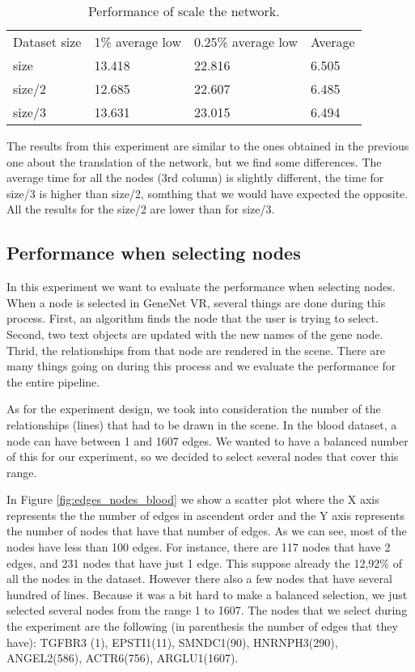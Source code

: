\begin{table}[h!]
\centering
\begin{tabular}{llll}
Dataset size & 1\% average low & 0.25\% average low & Average \\
size & 13.418 & 22.816 & 6.505 \\
size/2 & 12.685 & 22.607 & 6.485 \\
size/3 & 13.631 & 23.015 & 6.494 \\
\end{tabular}
\caption{Performance of scale the network.}
\label{tab:experiment_scale}
\end{table}

The results from this experiment are similar to the ones obtained in the previous one about the translation of the network, but we find some differences. The average time for all the nodes (3rd column) is slightly different, the time for size/3 is higher than size/2, somthing that we would have expected the opposite. All the results for the size/2 are lower than for size/3.

\subsection{Performance when selecting nodes}
In this experiment we want to evaluate the performance when selecting nodes. When a node is selected in GeneNet VR, several things are done during this process. First, an algorithm finds the node that the user is trying to select. Second, two text objects are updated with the new names of the gene node. Thrid, the relationships from that node are rendered in the scene. There are many things going on during this process and we evaluate the performance for the entire pipeline.

As for the experiment design, we took into consideration the number of the relationships (lines) that had to be drawn in the scene. In the blood dataset, a node can have between 1 and 1607 edges. We wanted to have a balanced number of this for our experiment, so we decided to select several nodes that cover this range.

In Figure \ref{fig:edges_nodes_blood} we show a scatter plot where the X axis represents the the number of edges in ascendent order and the Y axis represents the number of nodes that have that number of edges. As we can see, most of the nodes have less than 100 edges. For instance, there are 117 nodes that have 2 edges, and 231 nodes that have just 1 edge. This suppose already the 12,92\% of all the nodes in the dataset. However there also a few nodes that have several hundred of lines. Because it was a bit hard to make a balanced selection, we just selected several nodes from the range 1 to 1607. The nodes that we select during the experiment are the following (in parenthesis the number of edges that they have): TGFBR3 (1), EPSTI1(11), SMNDC1(90), HNRNPH3(290), ANGEL2(586), ACTR6(756), ARGLU1(1607).

